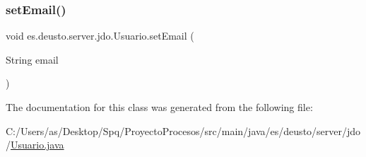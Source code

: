 \mbox{\label{classes_1_1deusto_1_1server_1_1jdo_1_1_usuario_a21f39f8557815c50c81baf11b13c666f}} 
\subsubsection{\texorpdfstring{setEmail()}{setEmail()}}
{\footnotesize\ttfamily void es.\+deusto.\+server.\+jdo.\+Usuario.\+set\+Email (\begin{DoxyParamCaption}\item[{String}]{email }\end{DoxyParamCaption})}



The documentation for this class was generated from the following file\+:\begin{DoxyCompactItemize}
\item 
C\+:/\+Users/as/\+Desktop/\+Spq/\+Proyecto\+Procesos/src/main/java/es/deusto/server/jdo/\mbox{\hyperlink{_usuario_8java}{Usuario.\+java}}\end{DoxyCompactItemize}
